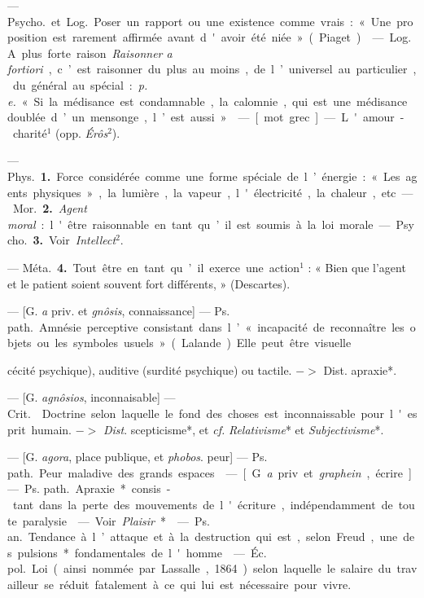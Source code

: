 \begin{itemize}[leftmargin=1cm, label=, itemsep=1pt]
 — \si{Psycho.} et \si{Log.} Poser
un rapport ou une existence comme
vrais : « Une proposition est rarement
affirmée avant d'avoir été niée »
(Piaget).

 — \si{Log.} A plus forte raison.
{\it Raisonner a fortiori}, c’est raisonner
du plus au moins, de l’universel au
particulier, du général au spécial :
{\it p. e.} « Si la médisance est condamnable,
 la calomnie, qui est une médisance
doublée d’un mensonge, l’est aussi ».

 — [mot grec] — L'amour-charité$^1$
(opp. {\it Érôs}$^2$).

 — \si{Phys.} {\bf 1.} Force considérée
comme une forme spéciale de l’énergie : « Les agents physiques », la
lumière, la vapeur, l'électricité, la
chaleur, etc.

— \si{Mor.} {\bf 2.} {\it Agent moral} : l'être
raisonnable en tant qu’il est soumis
à la loi morale.

— \si{Psycho.} {\bf 3.} Voir {\it Intellect}$^2$.

— \si{Méta.} {\bf 4.} Tout être en tant
qu’il exerce une action$^1$ : « Bien
que l'agent et le patient soient souvent fort différents, » (Descartes).

 — [G. {\it a} priv. et {\it gnôsis}, connaissance] — \si{Ps. path.} Amnésie
perceptive consistant dans l’ « incapacité de reconnaître les objets ou les
symboles usuels » (Lalande). Elle
peut être visuelle {cécité psychique),
auditive (surdité psychique) ou tactile. $->$ Dist. apraxie*.

 — [G. {\it agnôsios}, inconnaisable]
— \si{Crit.}  Doctrine selon
laquelle le fond des choses est
inconnaissable pour l'esprit humain.
$->$ {\it Dist}. scepticisme*, et {\it cf.}  {\it Relativisme}* et {\it Subjectivisme}*.

 — [G. {\it agora}, place publique,
et {\it phobos}. peur] — \si{Ps. path.} Peur
maladive des grands espaces.

 — [G. {\it a} priv. et {\it graphein},
écrire] — \si{Ps. path.} Apraxie* consis-
tant dans la perte des mouvements
de l'écriture, indépendamment de
toute paralysie.

 — Voir {\it Plaisir}*.

 — \si{Ps. an.} Tendance à
l’attaque et à la destruction qui est,
selon Freud, une des pulsions* fondamentales de l'homme.

 — \si{Éc. pol.} Loi (ainsi
nommée par Lassalle, 1864) selon
laquelle le salaire du travailleur se
réduit fatalement à ce qui lui est
nécessaire pour vivre.

}
\end{itemize}
